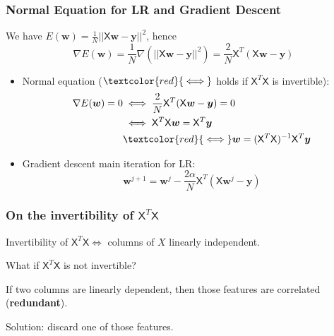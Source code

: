 \documentclass{beamer}
\begin{document}
	\begin{frame}
		\frametitle{Normal Equation for LR and Gradient Descent}
		We have $E(\bm{w}) = \frac{1}{N} ||\mathsf{X}\bm{w} - \bm{y}||^2$, hence
		\begin{equation*}
			\nabla E(\bm{w}) = \frac{1}{N} \nabla (||\mathsf{X}\bm{w} - \bm{y}||^2) = \frac{2}{N}\mathsf{X}^T(\mathsf{X}\bm{w} - \bm{y})
		\end{equation*}
	
	\begin{itemize}
		\item 	Normal equation ($\textcolor{red}{\iff}$ holds if $\mathsf{X}^T\mathsf{X}$ is invertible):
		\begin{align*}
			\nabla E(\bm{w}) = 0 &\iff \frac{2}{N}\mathsf{X}^T(\mathsf{X}\bm{w} - \bm{y}) = 0\\ 
			&\iff \mathsf{X}^T\mathsf{X}\bm{w} = \mathsf{X}^T\bm{y}\\
			& \textcolor{red}{\iff} \bm{w} = (\mathsf{X}^T\mathsf{X})^{-1}\mathsf{X}^T\bm{y}
		\end{align*}
		\item Gradient descent main iteration for LR:
		\begin{equation*}
			\bm{w}^{j+1} = \bm{w}^{j} - \frac{2\alpha}{N}\mathsf{X}^T(\mathsf{X}\bm{w}^j - \bm{y})
		\end{equation*}
	\end{itemize}

	\end{frame}

	\begin{frame}
		\frametitle{On the invertibility of $\mathsf{X}^T\mathsf{X}$}
		
		Invertibility of $\mathsf{X}^T\mathsf{X} \iff$ columns of $X$ linearly independent.
		
		\vspace{5mm}
		
		What if $\mathsf{X}^T\mathsf{X}$ is not invertible?
		
		\vspace{5mm}
		
		If two columns are linearly dependent, then those features are correlated (\textbf{redundant}).
		
		\vspace{5mm}
		
		Solution: discard one of those features.
	\end{frame}
\end{document}
